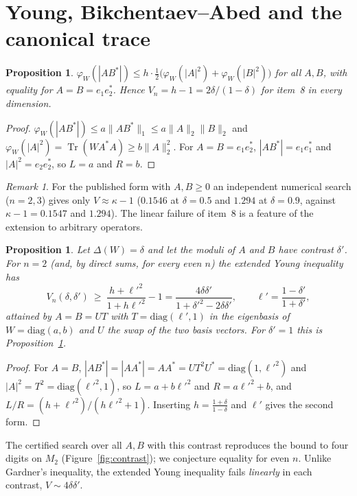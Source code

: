 \documentclass[11pt]{article}
\DeclareMathOperator{\Tr}{Tr}
\theoremstyle{plain}
\newtheorem{proposition}[theorem]{Proposition}
\theoremstyle{definition}
\theoremstyle{remark}
\newtheorem{remark}[theorem]{Remark}
\begin{document}
\section{Young, Bikchentaev--Abed and the canonical trace}\label{sec:linear}

\begin{proposition}\label{prop:young}
$\varphi_W(|AB^*|)\le h\cdot\frac12\bigl(\varphi_W(|A|^2)+\varphi_W(|B|^2)\bigr)$ for all $A,B$, with equality for
$A=B=e_1e_2^*$. Hence $V_n=h-1=2\delta/(1-\delta)$ for item~8 in every dimension.
\end{proposition}
\begin{proof}
$\varphi_W(|AB^*|)\le a\|AB^*\|_1\le a\|A\|_2\|B\|_2$ and $\varphi_W(|A|^2)=\Tr(WA^*A)\ge b\|A\|_2^2$. For $A=B=e_1e_2^*$,
$|AB^*|=e_1e_1^*$ and $|A|^2=e_2e_2^*$, so $L=a$ and $R=b$.
\end{proof}

\begin{remark}
For the published form with $A,B\ge0$ an independent numerical search ($n=2,3$) gives only $V\approx\kappa-1$
($0.1546$ at $\delta=0.5$ and $1.294$ at $\delta=0.9$, against $\kappa-1=0.1547$ and $1.294$). The linear failure of
item~8 is a feature of the extension to arbitrary operators.
\end{remark}

\begin{proposition}\label{prop:youngtwo}
Let $\Delta(W)=\delta$ and let the moduli of $A$ and $B$ have contrast $\delta'$. For $n=2$ (and, by direct sums, for every
even $n$) the extended Young inequality has
\[
  V_n(\delta,\delta')\ \ge\ \frac{h+\ell'^2}{1+h\ell'^2}-1=\frac{4\delta\delta'}{1+\delta'^2-2\delta\delta'},\qquad
  \ell'=\frac{1-\delta'}{1+\delta'},
\]
attained by $A=B=UT$ with $T=\mathrm{diag}(\ell',1)$ in the eigenbasis of $W=\mathrm{diag}(a,b)$ and $U$ the swap of the
two basis vectors. For $\delta'=1$ this is Proposition~\ref{prop:young}.
\end{proposition}
\begin{proof}
For $A=B$, $|AB^*|=|AA^*|=AA^*=UT^2U^*=\mathrm{diag}(1,\ell'^2)$ and $|A|^2=T^2=\mathrm{diag}(\ell'^2,1)$, so $L=a+b\ell'^2$ and
$R=a\ell'^2+b$, and $L/R=(h+\ell'^2)/(h\ell'^2+1)$. Inserting $h=\frac{1+\delta}{1-\delta}$ and $\ell'$ gives the second form.
\end{proof}

\noindent The certified search over all $A,B$ with this contrast reproduces the bound to four digits on $M_2$
(Figure~\ref{fig:contrast}); we conjecture equality for even $n$. Unlike Gardner's inequality, the extended Young
inequality fails \emph{linearly} in each contrast, $V\sim4\delta\delta'$.
\end{document}
